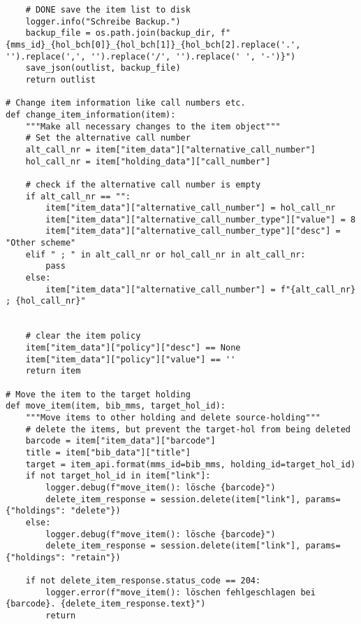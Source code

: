 \documentclass[10pt, a4paper]{scrartcl}
\begin{document}
\begin{verbatim}
    # DONE save the item list to disk
    logger.info("Schreibe Backup.")
    backup_file = os.path.join(backup_dir, f"{mms_id}_{hol_bch[0]}_{hol_bch[1]}_{hol_bch[2].replace('.', '').replace(',', '').replace('/', '').replace(' ', '-')}")
    save_json(outlist, backup_file)
    return outlist

# Change item information like call numbers etc.
def change_item_information(item):
    """Make all necessary changes to the item object"""
    # Set the alternative call number
    alt_call_nr = item["item_data"]["alternative_call_number"]
    hol_call_nr = item["holding_data"]["call_number"]

    # check if the alternative call number is empty
    if alt_call_nr == "":
        item["item_data"]["alternative_call_number"] = hol_call_nr
        item["item_data"]["alternative_call_number_type"]["value"] = 8
        item["item_data"]["alternative_call_number_type"]["desc"] = "Other scheme"
    elif " ; " in alt_call_nr or hol_call_nr in alt_call_nr:
        pass
    else:
        item["item_data"]["alternative_call_number"] = f"{alt_call_nr} ; {hol_call_nr}"


    # clear the item policy
    item["item_data"]["policy"]["desc"] == None
    item["item_data"]["policy"]["value"] == ''
    return item

# Move the item to the target holding
def move_item(item, bib_mms, target_hol_id):
    """Move items to other holding and delete source-holding"""
    # delete the items, but prevent the target-hol from being deleted
    barcode = item["item_data"]["barcode"]
    title = item["bib_data"]["title"]
    target = item_api.format(mms_id=bib_mms, holding_id=target_hol_id)
    if not target_hol_id in item["link"]:
        logger.debug(f"move_item(): lösche {barcode}")
        delete_item_response = session.delete(item["link"], params={"holdings": "delete"})
    else:
        logger.debug(f"move_item(): lösche {barcode}")
        delete_item_response = session.delete(item["link"], params={"holdings": "retain"})

    if not delete_item_response.status_code == 204:
        logger.error(f"move_item(): löschen fehlgeschlagen bei {barcode}. {delete_item_response.text}")
        return


\end{verbatim}
\end{document}
